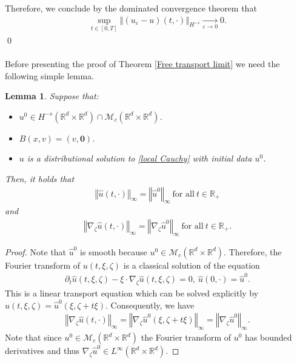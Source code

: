 \documentclass[11pt,reqno]{amsart}
\newtheorem{lem}[thm]{Lemma}
\numberwithin{equation}{section}
\begin{document}
Therefore, we conclude by the dominated convergence theorem that 
\begin{align*}
\underset{t\in [0,T]}{\sup}\left\Vert (u_{\varepsilon}-u)(t,\cdot)\right\Vert_{H^{-s}}\underset{\varepsilon\rightarrow 0}{\rightarrow}0.      
\end{align*}
\qed
\\\\
Before presenting the proof of Theorem \ref{Free transport limit} we need the following simple lemma. 
\begin{lem}\label{bound on negative weighted fourier}
Suppose that: 
\begin{itemize}
    \item $u^{0}\in H^{-s}(\mathbb{R}^{d}\times \mathbb{R}^{d})\cap \mathcal{M}_{c}(\mathbb{R}^{d}\times \mathbb{R}^{d})$. 
    \item $B(x,v)=(v,\mathbf{0})$.
    \item $u$ is a distributional solution to \eqref{local Cauchy} with initial data $u^{0}$. 
\end{itemize}
Then, it holds that 
\begin{align*}
\left\Vert \widehat{u}(t,\cdot)\right\Vert_{\infty}=\left\Vert \widehat{u}^{0}\right\Vert_{\infty}\ \mbox{for all}\ t\in \mathbb{R}_{+}     
\end{align*}
and 
\begin{align}
\left\Vert  \nabla_{\zeta}\widehat{u}(t,\cdot)\right\Vert_{\infty}=\left\Vert \nabla_{\zeta}\widehat{u}^{0}\right\Vert_{\infty} \ \mbox{for all}\ t\in \mathbb{R}_{+}.   \label{Linfty of weighted grad fourier}    
\end{align}
\end{lem}
\begin{proof}
Note that $\widehat{u}^{0}$ is smooth because $u^{0}\in \mathcal{M}_{c}(\mathbb{R}^{d}\times \mathbb{R}^{d})$. Therefore, the Fourier transform of $u(t,\xi,\zeta)$ is a classical solution of the equation 
\begin{align*}
\partial_{t}\widehat{u}(t,\xi,\zeta)-\xi\cdot \nabla_{\zeta}\widehat{u}(t,\xi,\zeta)=0,\ \widehat{u}(0,\cdot)=\widehat{u}^{0}.   \end{align*}
This is a linear transport equation which can be solved explicitly by $\widehat{u}(t,\xi,\zeta)=\widehat{u}^{0}(\xi,\zeta+t\xi)$. Consequently, we have 
\begin{align*}
\left\Vert \nabla_{\zeta}\widehat{u}(t,\cdot)\right\Vert_{\infty}=\left\Vert \nabla_{\zeta}\widehat{u}^{0}(\xi,\zeta+t\xi)\right\Vert_{\infty}= \left\Vert \nabla_{\zeta}\widehat{u}^{0}\right\Vert_{\infty}.        
\end{align*}
Note that since $u^{0}\in \mathcal{M}_{c}(\mathbb{R}^{d}\times \mathbb{R}^{d})$ the Fourier transform of $u^{0}$ has bounded derivatives and thus $\nabla_{\zeta}\widehat{u}^{0}\in L^{\infty}(\mathbb{R}^{d}\times \mathbb{R}^{d})$. 
\end{proof} 
\end{document}
